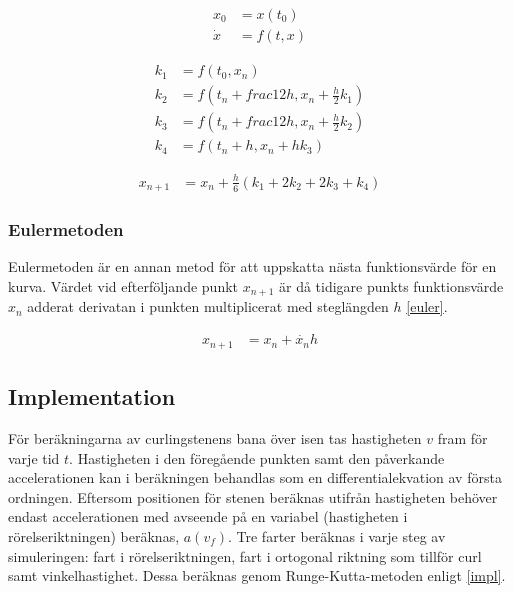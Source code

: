 \documentclass[11pt]{article} %
\begin{document}
 \begin{subequations}
 \begin{align} 
 x_0& = x(t_0)\\ \label{xdot}
 \dot{x}& = f(t,x)
 \end{align}
\end{subequations}

 \begin{subequations}\label{koeff}
 \begin{align}
 k_1& = f(t_0,x_n)\\
 k_2& = f(t_n + frac{1}{2} h, x_n + \frac{h}{2} k_1)\\
 k_3& = f(t_n + frac{1}{2} h, x_n + \frac{h}{2} k_2)\\
 k_4& = f(t_n + h, x_n + h k_3)
 \end{align}
\end{subequations}

 \begin{align}\label{RungeKutta_transl}
 x_{n+1}& =x_n + \frac{h}{6} (k_1+2 k_2 + 2 k_3 + k_4)
 \end{align}

\subsubsection{Eulermetoden}
Eulermetoden är en annan metod för att uppskatta nästa funktionsvärde för en kurva.
Värdet vid efterföljande punkt $x_{n+1}$ är då tidigare punkts funktionsvärde $x_n$ adderat
derivatan i punkten multiplicerat med steglängden $h$ \eqref{euler}.

 \begin{align}\label{euler}
 x_{n+1}& =x_n + \dot{x_n} h
 \end{align}

 

\subsection{Implementation}
För beräkningarna av curlingstenens bana över isen tas hastigheten $v$ fram för varje tid $t$. Hastigheten i den föregående punkten samt den påverkande accelerationen kan i beräkningen behandlas som en differentialekvation av första ordningen. Eftersom positionen för stenen beräknas utifrån hastigheten behöver endast accelerationen med avseende på en variabel (hastigheten i rörelseriktningen) beräknas, $a(v_f)$. Tre farter beräknas i varje steg av simuleringen: fart i rörelseriktningen, fart i ortogonal riktning som tillför curl samt vinkelhastighet. Dessa beräknas genom Runge-Kutta-metoden enligt \eqref{impl}. 
\end{document}
